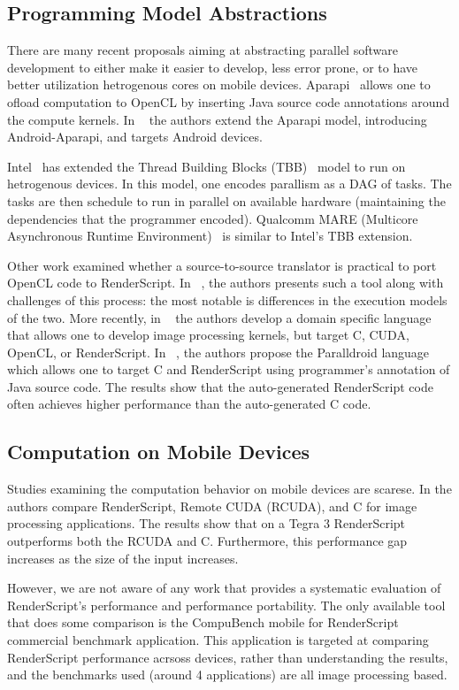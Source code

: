\subsection{Programming Model Abstractions}


There are many recent proposals aiming at abstracting parallel software development to either make it easier to develop, less error prone, or to have better utilization hetrogenous cores on mobile devices. Aparapi~\cite{Aparapi_web} allows one to ofload computation to OpenCL by inserting Java source code annotations around the compute kernels. In ~\cite{6704508} the authors extend the Aparapi model, introducing Android-Aparapi, and targets Android devices.

Intel~\cite{barik2014efficient} has extended the Thread Building Blocks (TBB)~\cite{reinders2007intel} model to run on hetrogenous devices. In this model, one encodes
	parallism as a DAG of tasks.
The tasks are then schedule to run in parallel on available hardware (maintaining the dependencies that the programmer encoded).
Qualcomm MARE (Multicore Asynchronous Runtime Environment)~\cite{MARE_qc} is similar to Intel's TBB extension.

Other work examined whether a source-to-source translator is practical to 
	port OpenCL code to RenderScript.
In ~\cite{yang2012o2render}, the authors presents such a tool along with challenges of this process:
the most notable is differences in the execution models of the two.
More recently, in ~\cite{hipacc} the authors develop a domain specific language that allows
one to develop image processing kernels, but target C, CUDA, OpenCL, or RenderScript. In ~\cite{alejandro2014performance}, the authors
propose the Paralldroid language which allows one to target C and RenderScript using 
programmer's annotation of Java source code. The results show that the auto-generated
RenderScript code often achieves higher performance than the auto-generated
C code. 

\subsection{Computation on Mobile Devices}

Studies examining the computation behavior on mobile devices are scarese.
In \cite{kemp2013using} the authors compare RenderScript, Remote CUDA (RCUDA), and C for image processing applications. The results show that on a Tegra 3
RenderScript outperforms both the RCUDA and
C. Furthermore, this performance gap increases as the size of
the input increases.

However, we are not aware of any work that provides a
systematic evaluation of RenderScript's performance and performance portability.
The only available tool that does some comparison is the CompuBench mobile
for RenderScript~\cite{compuBenchMobile} commercial benchmark application. 
This application is targeted at comparing RenderScript performance acrsoss devices, rather than understanding the results, and the benchmarks used (around 4 applications) are all image processing based.


